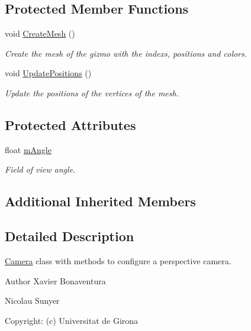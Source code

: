 \subsection*{Protected Member Functions}
\begin{DoxyCompactItemize}
\item 
void \hyperlink{class_perspective_camera_acefab56b5bf9449e1a97e0f193702d36}{Create\+Mesh} ()
\begin{DoxyCompactList}\small\item\em Create the mesh of the gizmo with the indexs, positions and colors. \end{DoxyCompactList}\item 
void \hyperlink{class_perspective_camera_a80ca50f210c1ea07f346bcee9dff6451}{Update\+Positions} ()
\begin{DoxyCompactList}\small\item\em Update the positions of the vertices of the mesh. \end{DoxyCompactList}\end{DoxyCompactItemize}
\subsection*{Protected Attributes}
\begin{DoxyCompactItemize}
\item 
float \hyperlink{class_perspective_camera_ada0d00e4ec22629c55df5ab0af4a3857}{m\+Angle}
\begin{DoxyCompactList}\small\item\em Field of view angle. \end{DoxyCompactList}\end{DoxyCompactItemize}
\subsection*{Additional Inherited Members}


\subsection{Detailed Description}
\hyperlink{class_camera}{Camera} class with methods to configure a perspective camera. 

\begin{DoxyAuthor}{Author}
Xavier Bonaventura 

Nicolau Sunyer 

Copyright\+: (c) Universitat de Girona 
\end{DoxyAuthor}


